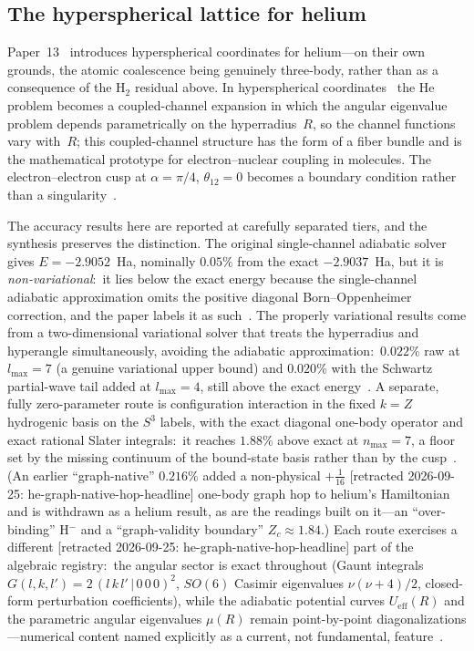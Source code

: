 \documentclass[aps,pra,twocolumn,superscriptaddress,longbibliography]{revtex4-2}
\newcommand{\gvc}[2]{#2}
\begin{document}
\subsection{The hyperspherical lattice for helium}

Paper~13~\cite{loutey_paper13} introduces hyperspherical coordinates
for helium---on their own grounds, the atomic coalescence being
genuinely three-body, rather than as a consequence of the H$_2$
residual above.  In
hyperspherical coordinates~\cite{aquilanti1986, avery1989} the He problem becomes a coupled-channel
expansion in which the angular eigenvalue problem depends parametrically
on the hyperradius~$R$, so the channel functions vary with~$R$; this
coupled-channel structure has the form of a fiber bundle and is the
mathematical prototype for electron--nuclear coupling in molecules.
The electron--electron cusp at $\alpha = \pi/4$, $\theta_{12}=0$ becomes
a boundary condition rather than a singularity~\cite{loutey_paper13}.

The accuracy results here are reported at carefully separated tiers, and
the synthesis preserves the distinction.  The original single-channel
adiabatic solver gives $E = -2.9052$~Ha, nominally $0.05\%$ from the
exact $-2.9037$~Ha, but it is \emph{non-variational}:\ it lies below the
exact energy because the single-channel adiabatic approximation omits the
positive diagonal Born--Oppenheimer correction, and the paper labels it as
such~\cite{loutey_paper13}.  The properly variational results come from
a two-dimensional variational solver that treats the hyperradius and
hyperangle simultaneously, avoiding the adiabatic approximation:\
\gvc{he-bracket}{$0.022\%$ raw at $l_{\max}=7$ (a genuine variational upper bound) and
$0.020\%$ with the Schwartz partial-wave tail added at $l_{\max}=4$, still
above the exact energy}~\cite{loutey_paper13}.  A separate, fully zero-parameter route
is configuration interaction in the fixed $k=Z$ hydrogenic basis on
the $S^3$ labels, with the exact diagonal one-body operator and exact
rational Slater integrals:\ it reaches $1.88\%$ above exact at
$n_{\max}=7$, a floor set by the missing continuum of the bound-state
basis rather than by the cusp~\cite{loutey_paper13}.  (An earlier
``graph-native'' $0.216\%$ added a non-physical $+\tfrac{1}{16}$ [retracted 2026-09-25: he-graph-native-hop-headline]
one-body graph hop to helium's Hamiltonian and is withdrawn as a helium
result, as are the readings built on it---an ``over-binding'' H$^-$
and a ``graph-validity boundary'' $Z_c \approx 1.84$.)  Each route exercises a different [retracted 2026-09-25: he-graph-native-hop-headline]
part of the algebraic registry:\ the angular sector is exact throughout
(Gaunt integrals $G(l,k,l') = 2\,(l\,k\,l'\,|\,0\,0\,0)^2$, $SO(6)$
Casimir eigenvalues $\nu(\nu+4)/2$, closed-form perturbation
coefficients), while the adiabatic potential curves $U_{\mathrm{eff}}(R)$
and the parametric angular eigenvalues $\mu(R)$ remain point-by-point
diagonalizations---numerical content named explicitly as a current,
not fundamental, feature~\cite{loutey_paper13, loutey_paper18}.
\end{document}

